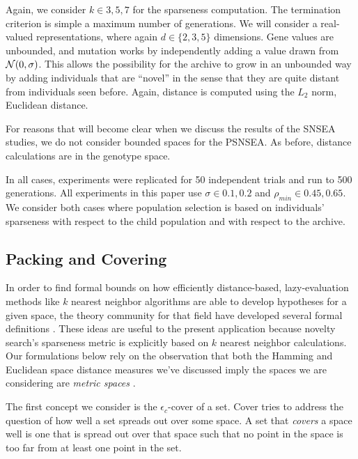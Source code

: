 \documentclass[twoside]{article}
\begin{document}
Again, we consider $k\in{3,5,7}$ for the sparseness computation.  The termination criterion is simple a maximum number of generations.  We will consider a real-valued representations, where again $d\in\{2,3,5\}$ dimensions.  Gene values are unbounded, and mutation works by independently adding a value drawn from ${\cal N}(0,\sigma)$.  This allows the possibility for the archive to grow in an unbounded way by adding individuals that are ``novel'' in the sense that they are quite distant from individuals seen before.  Again, distance is computed using the $L_2$ norm, Euclidean distance.

For reasons that will become clear when we discuss the results of the SNSEA studies, we do not consider bounded spaces for the PSNSEA.  As before, distance calculations are in the genotype space.

In all cases, experiments were replicated for 50 independent trials and run to 500 generations. All experiments in this paper use $\sigma\in{0.1,0.2}$ and $\rho_{min} \in {0.45, 0.65}$.  We consider both cases where population selection is based on individuals' sparseness with respect to the child population and with respect to the archive.


\subsection{Packing and Covering}
\label{subsec:knn}

In order to find formal bounds on how efficiently distance-based, lazy-evaluation methods like $k$ nearest neighbor algorithms are able to develop hypotheses for a given space, the theory community for that field have developed several formal definitions \cite{Clarkson1999dcg}.  These ideas are useful to the present application because novelty search's sparseness metric is explicitly based on $k$ nearest neighbor calculations.  Our formulations below rely on the observation that both the Hamming and Euclidean space distance measures we've discussed imply the spaces we are considering are \emph{metric spaces} \cite{??}.

The first concept we consider is the $\epsilon_c$-cover of a set.  Cover tries to address the question of how well a set spreads out over some space.  A set that \emph{covers} a space well is one that is spread out over that space such that no point in the space is too far from at least one point in the set.
\end{document}
